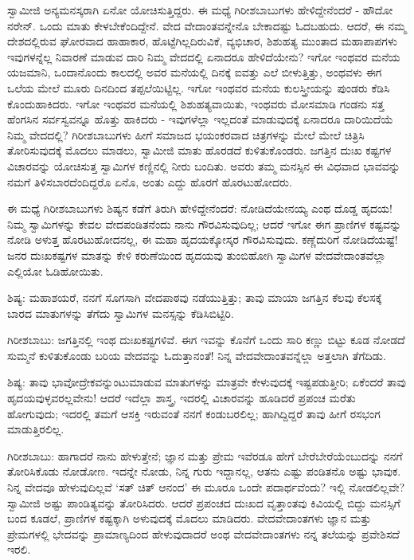 ಸ್ವಾಮೀಜಿ ಅನ್ಯಮನಸ್ಕರಾಗಿ ಏನೋ ಯೋಚಿಸುತ್ತಿದ್ದರು. ಈ ಮಧ್ಯೆ ಗಿರೀಶಬಾಬುಗಳು ಹೇಳಿದ್ದೇನೆಂದರೆ - ಹೌದೋ ನರೇನ್. ಒಂದು ಮಾತು ಕೇಳಬೇಕೆಂದಿದ್ದೇನೆ. ವೇದ ವೇದಾಂತವನ್ನೇನೊ ಬೇಕಾದಷ್ಟು ಓದಬಹುದು. ಆದರೆ, ಈ ನಮ್ಮ ದೇಶದಲ್ಲಿರುವ ಘೋರವಾದ ಹಾಹಾಕಾರ, ಹೊಟ್ಟೆಗಿಲ್ಲದಿರುವಿಕೆ, ವ್ಯಭಿಚಾರ, ಶಿಶುಹತ್ಯ ಮುಂತಾದ ಮಹಾಪಾಪಗಳು ಇವುಗಳನ್ನೆಲ್ಲ ನಿವಾರಣೆ ಮಾಡುವ ದಾರಿ ನಿಮ್ಮ ವೇದದಲ್ಲಿ ಏನಾದರೂ ಹೇಳಿದೆಯೇನು? ಇಗೋ ಇಂಥವರ ಮನೆಯ ಯಜಮಾನಿ, ಒಂದಾನೊಂದು ಕಾಲದಲ್ಲಿ ಅವರ ಮನೆಯಲ್ಲಿ ದಿನಕ್ಕೆ ಐವತ್ತು ಎಲೆ ಬೀಳುತ್ತಿತ್ತು, ಅಂಥವಳು ಈಗ ಒಲೆಯ ಮೇಲೆ ಮೂರು ದಿನದಿಂದ ತಪ್ಪಲೆಯಿಟ್ಟಿಲ್ಲ. ಇಗೋ ಇಂಥವರ ಮನೆಯ ಕುಲಸ್ತ್ರೀಯನ್ನು ಪುಂಡರು ಕೆಡಿಸಿ ಕೊಂದುಹಾಕಿದರು. ಇಗೋ ಇಂಥವರ ಮನೆಯಲ್ಲಿ ಶಿಶುಹತ್ಯವಾಯಿತು, ಇಂಥವರು ಮೋಸಮಾಡಿ ಗಂಡನು ಸತ್ತ ಹೆಂಗಸಿನ ಸರ್ವಸ್ವವನ್ನೂ ಹೊತ್ತು ಹಾಕಿದರು - ಇವುಗಳೆಲ್ಲಾ ಇಲ್ಲದಂತೆ ಮಾಡುವುದಕ್ಕೆ ಏನಾದರೂ ದಾರಿಯಿದೆಯೆ ನಿಮ್ಮ ವೇದದಲ್ಲಿ? ಗಿರೀಶಬಾಬುಗಳು ಹೀಗೆ ಸಮಾಜದ ಭಯಂಕರವಾದ ಚಿತ್ರಗಳನ್ನು ಮೇಲೆ ಮೇಲೆ ಚಿತ್ರಿಸಿ ತೋರಿಸುವುದಕ್ಕೆ ಮೊದಲು ಮಾಡಲು, ಸ್ವಾಮೀಜಿ ಮಾತು ಹೊರಡದೆ ಕುಳಿತುಕೊಂಡರು. ಜಗತ್ತಿನ ದುಃಖ ಕಷ್ಟಗಳ ವಿಚಾರವನ್ನು ಯೋಚಿಸುತ್ತ ಸ್ವಾಮಿಗಳ ಕಣ್ಣಿನಲ್ಲಿ ನೀರು ಬಂದಿತು. ಅವರು ತಮ್ಮ ಮನಸ್ಸಿನ ಈ ವಿಧವಾದ ಭಾವವನ್ನು ನಮಗೆ ತಿಳಿಸಬಾರದೆಂದಿದ್ದರೊ ಏನೊ, ಅಂತು ಎದ್ದು ಹೊರಗೆ ಹೊರಟುಹೋದರು.

ಈ ಮಧ್ಯೆ ಗಿರೀಶಬಾಬುಗಳು ಶಿಷ್ಯನ ಕಡೆಗೆ ತಿರುಗಿ ಹೇಳಿದ್ದೇನೆಂದರೆ: ನೋಡಿದೆಯೇನಯ್ಯ ಎಂಥ ದೊಡ್ಡ ಹೃದಯ! ನಿಮ್ಮ ಸ್ವಾಮಿಗಳನ್ನು ಕೇವಲ ವೇದಪಂಡಿತನೆಂದು ನಾನು ಗೌರವಿಸುವುದಿಲ್ಲ; ಆದರೆ ಇಗೋ ಈಗ ಪ್ರಾಣಿಗಳ ಕಷ್ಟವನ್ನು ನೋಡಿ ಅಳುತ್ತ ಹೊರಟುಹೋದನಲ್ಲ, ಈ ಮಹಾ ಹೃದಯಕ್ಕೋಸ್ಕರ ಗೌರವಿಸುವುದು. ಕಣ್ಣೆದುರಿಗೆ ನೋಡಿದೆಯಷ್ಟೆ! ಜನರ ದುಃಖಕಷ್ಟಗಳ ಮಾತನ್ನು ಕೇಳಿ ಕರುಣೆಯಿಂದ ಹೃದಯವು ತುಂಬಿಹೋಗಿ ಸ್ವಾಮಿಗಳ ವೇದವೇದಾಂತವೆಲ್ಲಾ ಎಲ್ಲಿಯೋ ಓಡಿಹೋಯಿತು.

ಶಿಷ್ಯ: ಮಹಾಶಯರೆ, ನನಗೆ ಸೊಗಸಾಗಿ ವೇದಪಾಠವು ನಡೆಯುತ್ತಿತ್ತು; ತಾವು ಮಾಯಾ ಜಗತ್ತಿನ ಕೆಲವು ಕೆಲಸಕ್ಕೆ ಬಾರದ ಮಾತುಗಳನ್ನು ತೆಗೆದು ಸ್ವಾಮಿಗಳ ಮನಸ್ಸನ್ನು ಕೆಡಿಸಿಬಿಟ್ಟಿರಿ.

ಗಿರೀಶಬಾಬು: ಜಗತ್ತಿನಲ್ಲಿ ಇಂಥ ದುಃಖಕಷ್ಟಗಳಿವೆ. ಈಗ ಇವನ್ನು ಕೊನೆಗೆ ಒಂದು ಸಾರಿ ಕಣ್ಣು ಬಿಟ್ಟು ಕೂಡ ನೋಡದೆ ಸುಮ್ಮನೆ ಕುಳಿತುಕೊಂಡು ಬರಿಯ ವೇದವನ್ನು ಓದುತ್ತಾನಂತೆ! ನಿನ್ನ ವೇದವೇದಾಂತವನ್ನೆಲ್ಲಾ ಅತ್ತಲಾಗಿ ತೆಗೆದಿಡು.

ಶಿಷ್ಯ: ತಾವು ಭಾವೋದ್ರೇಕವನ್ನುಂಟುಮಾಡುವ ಮಾತುಗಳನ್ನು ಮಾತ್ರವೇ ಕೇಳುವುದಕ್ಕೆ ಇಷ್ಟಪಡುತ್ತೀರಿ; ಏಕೆಂದರೆ ತಾವು ಹೃದಯವುಳ್ಳವರಲ್ಲವೇನು! ಆದರೆ ಇದೆಲ್ಲಾ ಶಾಸ್ತ್ರ, ಇದರಲ್ಲಿ ವಿಚಾರವನ್ನು ಹೂಡಿದರೆ ಪ್ರಪಂಚ ಮರೆತು ಹೋಗುವುದು; ಇದರಲ್ಲಿ ತಮಗೆ ಆಸಕ್ತಿ ಇರುವಂತೆ ನನಗೆ ಕಂಡುಬರಲಿಲ್ಲ; ಹಾಗಿದ್ದಿದ್ದರೆ ತಾವು ಹೀಗೆ ರಸಭಂಗ ಮಾಡುತ್ತಿರಲಿಲ್ಲ.

ಗಿರೀಶಬಾಬು: ಹಾಗಾದರೆ ನಾನು ಹೇಳುತ್ತೇನೆ; ಜ್ಞಾನ ಮತ್ತು ಪ್ರೇಮ ಇವೆರಡೂ ಹೇಗೆ ಬೇರೆಬೇರೆಯೆಂಬುದನ್ನು ನನಗೆ ತೋರಿಸಿಕೊಡು ನೋಡೋಣ. ಇದನ್ನೇ ನೋಡು, ನಿನ್ನ ಗುರು ಇದ್ದಾನಲ್ಲ, ಆತನು ಎಷ್ಟು ಪಂಡಿತನೊ ಅಷ್ಟು ಭಾವುಕ. ನಿನ್ನ ವೇದವೂ ಹೇಳುವುದಿಲ್ಲವೆ ‘ಸತ್ ಚಿತ್ ಆನಂದ’ ಈ ಮೂರೂ ಒಂದೇ ಪದಾರ್ಥವೆಂದು? ಇಲ್ಲಿ ನೋಡಲಿಲ್ಲವೇ? ಸ್ವಾಮೀಜಿ ಅಷ್ಟು ಪಾಂಡಿತ್ಯವನ್ನು ತೋರಿಸಿದರು. ಆದರೆ ಪ್ರಪಂಚದ ದುಃಖದ ವೃತ್ತಾಂತವು ಕಿವಿಯಲ್ಲಿ ಬಿದ್ದು ಮನಸ್ಸಿಗೆ ಬಂದ ಕೂಡಲೆ, ಪ್ರಾಣಿಗಳ ಕಷ್ಟಕ್ಕಾಗಿ ಅಳುವುದಕ್ಕೆ ಮೊದಲು ಮಾಡಿದರು. ವೇದವೇದಾಂತಗಳು ಜ್ಞಾನ ಮತ್ತು ಪ್ರೇಮಗಳಲ್ಲಿ ಭೇದವನ್ನು ಪ್ರಾಮಾಣ್ಯದಿಂದ ಹೇಳುವುದಾದರೆ ಅಂಥ ವೇದವೇದಾಂತಗಳು ನನ್ನ ತಲೆಯನ್ನು ಪ್ರವೇಶಿಸದೆ ಇರಲಿ.

